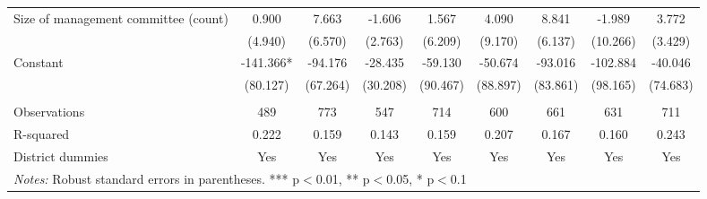 \documentclass[11pt]{article}
\begin{document}
\begin{landscape}
\begin{table}[H]
{\begin{tabularx}{1.8\linewidth}{lcccccccc}
Size of management committee (count) & 0.900 & 7.663 & -1.606 & 1.567 & 4.090 & 8.841 & -1.989 & 3.772 \\
 & (4.940) & (6.570) & (2.763) & (6.209) & (9.170) & (6.137) & (10.266) & (3.429) \\
Constant & -141.366* & -94.176 & -28.435 & -59.130 & -50.674 & -93.016 & -102.884 & -40.046 \\
 & (80.127) & (67.264) & (30.208) & (90.467) & (88.897) & (83.861) & (98.165) & (74.683) \\
 &  &  &  &  &  &  &  &  \\
Observations & 489 & 773 & 547 & 714 & 600 & 661 & 631 & 711 \\
R-squared & 0.222 & 0.159 & 0.143 & 0.159 & 0.207 & 0.167 & 0.160 & 0.243 \\
 District dummies & Yes & Yes & Yes & Yes & Yes & Yes & Yes & Yes \\ \hline
\multicolumn{9}{l}{\textit{Notes:} Robust standard errors in parentheses. *** p$<$0.01, ** p$<$0.05, * p$<$0.1} \\
  \end{tabularx}}
\end{table}
\doublespacing

\end{landscape}

\newpage

\end{document}
